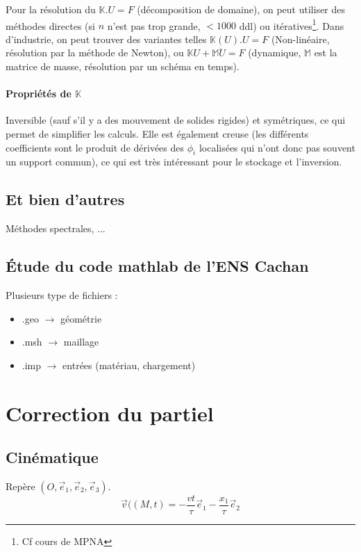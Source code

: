 \documentclass{article}
\begin{document}
Pour la résolution du $\mathbb{K}.U=F$ (décomposition de domaine), on peut utiliser des méthodes directes (si $n$ n'est pas trop grande, $< 1000$ ddl) ou itératives\footnote{Cf cours de MPNA}. Dans d'industrie, on peut trouver des variantes telles $\mathbb{K}(U).U=F$ (Non-linéaire, résolution par la méthode de Newton), ou $\mathbb{K}U+\mathbb{M}\ddot{U} = F$ (dynamique, $\mathbb{M}$ est la matrice de masse, résolution par un schéma en temps).

\paragraph{Propriétés de $\mathbb{K}$} Inversible (sauf s'il y a des mouvement de solides rigides) et symétriques, ce qui permet de simplifier les calculs. Elle est également creuse (les différents coefficients sont le produit de dérivées des $\phi_i$ localisées qui n'ont donc pas souvent un support commun), ce qui est très intéressant pour le stockage et l'inversion.

\subsection{Et bien d'autres}
Méthodes spectrales, ...

\subsection{Étude du code mathlab de l'ENS Cachan}
Plusieurs type de fichiers :
\begin{itemize}
\item .geo $\to$ géométrie
\item .msh $\to$ maillage
\item .imp $\to$ entrées (matériau, chargement)
\end{itemize}

\section{Correction du partiel}
\subsection{Cinématique}
Repère $(O,\vec{e}_1, \vec{e}_2, \vec{e}_3)$.
\[\vec{v}((M,t) = -\dfrac{vt}{\tau}\vec{e}_1-\dfrac{x_1}{\tau}\vec{e}_2\]
\end{document}
